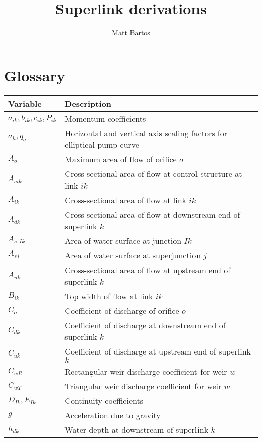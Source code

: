 \documentclass[11pt]{article}
\title{Superlink derivations}
\author{Matt Bartos}
\date{}
\begin{document}
\maketitle
\tableofcontents

\clearpage

\section{Glossary}

\begin{table}[!htb]
  \centering
  \begin{tabular}{l | l}
    \hline
    Variable & Description \\
    \hline
    $a_{ik}, b_{ik}, c_{ik}, P_{ik}$ & Momentum coefficients \\
    $a_h, q_q$ & Horizontal and vertical axis scaling factors for elliptical pump curve \\
    $A_{o}$ & Maximum area of flow of orifice $o$\\
    $A_{cik}$ & Cross-sectional area of flow at control structure at link $ik$ \\
    $A_{ik}$ & Cross-sectional area of flow at link $ik$ \\
    $A_{dk}$ & Cross-sectional area of flow at downstream end of superlink $k$ \\
    $A_{s,Ik}$ & Area of water surface at junction $Ik$ \\
    $A_{sj}$ & Area of water surface at superjunction $j$ \\
    $A_{uk}$ & Cross-sectional area of flow at upstream end of superlink $k$ \\
    $B_{ik}$ & Top width of flow at link $ik$ \\
    $C_{o}$ & Coefficient of discharge of orifice $o$ \\
    $C_{dk}$ & Coefficient of discharge at downstream end of superlink $k$ \\
    $C_{uk}$ & Coefficient of discharge at upstream end of superlink $k$ \\
    $C_{wR}$ & Rectangular weir discharge coefficient for weir $w$ \\
    $C_{wT}$ & Triangular weir discharge coefficient for weir $w$\\
    $D_{Ik}, E_{Ik}$ & Continuity coefficients \\
    $g$ & Acceleration due to gravity \\
    $h_{dk}$ & Water depth at downstream of superlink $k$ \\

\end{tabular}
\end{table}
\end{document}
